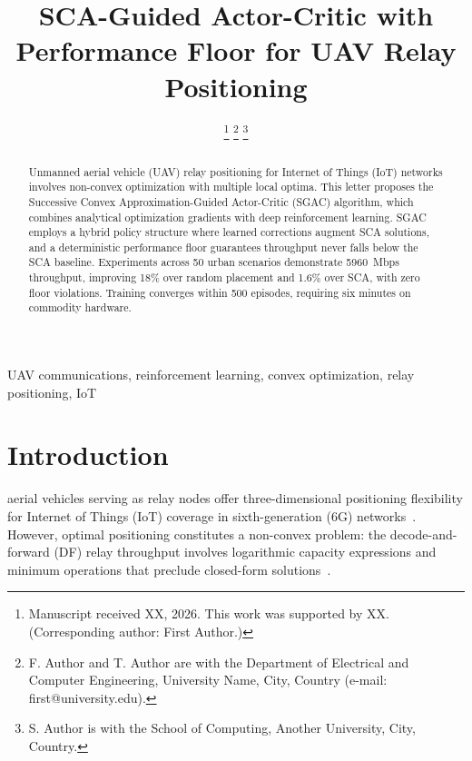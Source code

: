 \documentclass[journal]{IEEEtran}
\begin{document}
\title{SCA-Guided Actor-Critic with Performance Floor for UAV Relay Positioning}

\author{
\thanks{Manuscript received XX, 2026. This work was supported by XX. (Corresponding author: First Author.)}
\thanks{F. Author and T. Author are with the Department of Electrical and Computer Engineering, University Name, City, Country (e-mail: first@university.edu).}
\thanks{S. Author is with the School of Computing, Another University, City, Country.}
}

\maketitle

\begin{abstract}
Unmanned aerial vehicle (UAV) relay positioning for Internet of Things (IoT) networks involves non-convex optimization with multiple local optima. This letter proposes the Successive Convex Approximation-Guided Actor-Critic (SGAC) algorithm, which combines analytical optimization gradients with deep reinforcement learning. SGAC employs a hybrid policy structure where learned corrections augment SCA solutions, and a deterministic performance floor guarantees throughput never falls below the SCA baseline. Experiments across 50 urban scenarios demonstrate 5960~Mbps throughput, improving 18\% over random placement and 1.6\% over SCA, with zero floor violations. Training converges within 500 episodes, requiring six minutes on commodity hardware.
\end{abstract}

\begin{IEEEkeywords}
UAV communications, reinforcement learning, convex optimization, relay positioning, IoT
\end{IEEEkeywords}

\section{Introduction}

 aerial vehicles serving as relay nodes offer three-dimensional positioning flexibility for Internet of Things (IoT) coverage in sixth-generation (6G) networks~\cite{zeng2016, mozaffari2019}. However, optimal positioning constitutes a non-convex problem: the decode-and-forward (DF) relay throughput involves logarithmic capacity expressions and minimum operations that preclude closed-form solutions~\cite{wu2018}.
\end{document}
